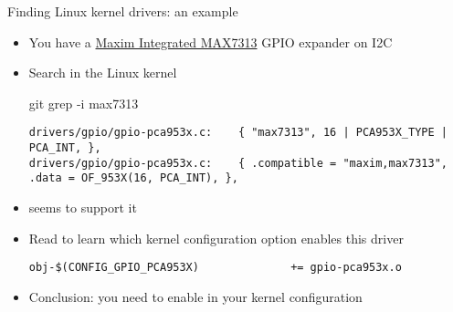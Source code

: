 \begin{frame}[fragile]{Finding Linux kernel drivers: an example}
  \begin{itemize}
  \item You have a
    \href{https://www.maximintegrated.com/en/products/interface/controllers-expanders/MAX7313.html}{Maxim
      Integrated MAX7313} GPIO expander on I2C
  \item Search in the Linux kernel
    \begin{block}{git grep -i max7313}
      {\tiny
\begin{verbatim}
drivers/gpio/gpio-pca953x.c:    { "max7313", 16 | PCA953X_TYPE | PCA_INT, },
drivers/gpio/gpio-pca953x.c:    { .compatible = "maxim,max7313", .data = OF_953X(16, PCA_INT), },
\end{verbatim}
      }
    \end{block}
  \item {} seems to support it
  \item Read  to learn which kernel
    configuration option enables this driver
    \begin{block}{}
      {\tiny
\begin{verbatim}
obj-$(CONFIG_GPIO_PCA953X)              += gpio-pca953x.o
\end{verbatim}
      }
    \end{block}
  \item Conclusion: you need to enable  in
    your kernel configuration
  \end{itemize}
\end{frame}
